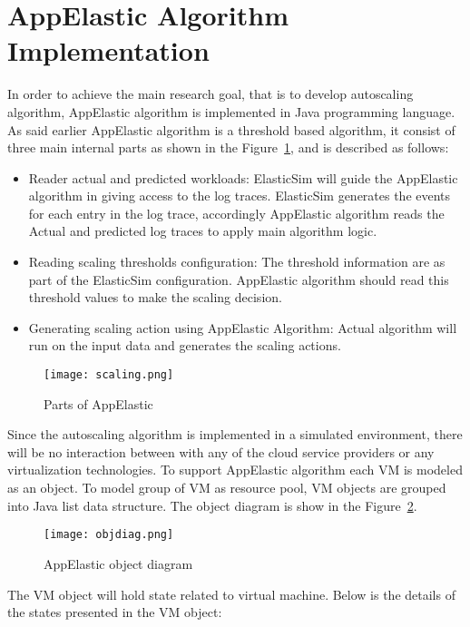\section{AppElastic Algorithm Implementation}
\label{sec:AppElastic Algorithm Implementation}
In order to achieve the main research goal, that is to develop autoscaling algorithm, AppElastic algorithm is implemented in Java programming language. As said earlier AppElastic algorithm is a threshold based algorithm, it consist of three main internal parts as shown in the Figure~\ref{figure:appelasticparts}, and is described as follows:
\begin{itemize}
  \item Reader actual and predicted workloads: ElasticSim will guide the AppElastic algorithm in giving access to the log traces. ElasticSim generates the events for each entry in the log trace, accordingly AppElastic algorithm reads the Actual and predicted log traces to apply main algorithm logic.
  \item  Reading scaling thresholds configuration: The threshold information are as part of the ElasticSim configuration. AppElastic algorithm should read this threshold values to make the scaling decision.
  \item Generating scaling action using AppElastic Algorithm: Actual algorithm will run on the input data and generates the scaling actions.
\end{itemize}
\begin{figure}[h]
  \begin{center}
    \texttt{[image: scaling.png]}
    \caption{Parts of AppElastic}
    \label{figure:appelasticparts}
  \end{center}
\end{figure}
Since the autoscaling algorithm is implemented in a simulated environment, there will be no interaction between with any of the cloud service providers or any virtualization technologies. To support AppElastic algorithm each VM is modeled as an object. To model group of VM as resource pool, VM objects are grouped into Java list data structure. The object diagram is show in the Figure~\ref{figure:objdiag}.
\begin{figure}[h]
  \begin{center}
    \texttt{[image: objdiag.png]}
    \caption{AppElastic object diagram}
    \label{figure:objdiag}
  \end{center}
\end{figure}
The VM object will hold state related to virtual machine. Below is the details of the states presented in the VM object:
